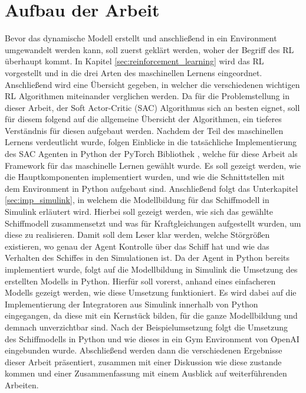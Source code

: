 \documentclass[]{iat}
\begin{document}
\section{Aufbau der Arbeit} \label{sec:aufbau_arbeit}
Bevor das dynamische Modell erstellt und anschließend in ein Environment umgewandelt werden kann, soll zuerst geklärt werden, woher der Begriff des RL überhaupt kommt. In Kapitel \ref{sec:reinforcement_learning} wird das RL vorgestellt und in die drei Arten des maschinellen Lernens eingeordnet. Anschließend wird eine Übersicht gegeben, in welcher die verschiedenen wichtigen RL Algorithmen miteinander verglichen werden. Da für die Problemstellung in dieser Arbeit, der Soft Actor-Critic (SAC) \cite[]{sacv2} Algorithmus sich an besten eignet, soll für diesem folgend auf die allgemeine Übersicht der Algorithmen, ein tieferes Verständnis für diesen aufgebaut werden. Nachdem der Teil des maschinellen Lernens verdeutlicht wurde, folgen Einblicke in die tatsächliche Implementierung des SAC Agenten in Python der PyTorch Bibliothek \cite[]{pytorch}, welche für diese Arbeit als Framework für das maschinelle Lernen gewählt wurde. Es soll gezeigt werden, wie die Hauptkomponenten implementiert wurden, und wie die Schnittstellen mit dem Environment in Python aufgebaut sind. Anschließend folgt das Unterkapitel \ref{sec:imp_simulink}, in welchem die Modellbildung für das Schiffmodell in Simulink erläutert wird. Hierbei soll gezeigt werden, wie sich das gewählte Schiffmodell zusammensetzt und was für Kraftgleichungen aufgestellt wurden, um diese zu realisieren. Damit soll dem Leser klar werden, welche Störgrößen existieren, wo genau der Agent Kontrolle über das Schiff hat und wie das Verhalten des Schiffes in den Simulationen ist. Da der Agent in Python bereits implementiert wurde, folgt auf die Modellbildung in Simulink die Umsetzung des erstellten Modells in Python. Hierfür soll vorerst, anhand eines einfacheren Modells gezeigt werden, wie diese Umsetzung funktioniert. Es wird dabei auf die Implementierung der Integratoren aus Simulink innerhalb von Python eingegangen, da diese mit ein Kernstück bilden, für die ganze Modellbildung und demnach unverzichtbar sind. Nach der Beispielumsetzung folgt die Umsetzung des Schiffmodells in Python und wie dieses in ein Gym Environment von OpenAI \cite[]{brockman2016openai} eingebunden wurde. Abschließend werden dann die verschiedenen Ergebnisse dieser Arbeit präsentiert, zusammen mit einer Diskussion wie diese zustande kommen und einer Zusammenfassung mit einem Ausblick auf weiterführenden Arbeiten.
\end{document}
